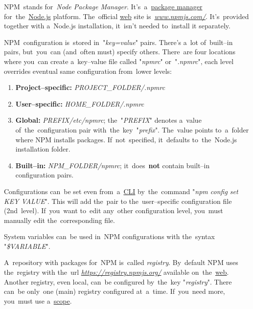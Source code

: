 


\label{nodejs}

\label{npm}
NPM~stands for~\textit{Node Package Manager}. It's~a~\hyperref[packagemanager]{package manager} for~the~\hyperref[nodejs]{Node.js} platform. The~official \hyperref[internetweb]{web} site is~\href{https://www.npmjs.com/}{\textit{www.npmjs.com/}}. It's~provided together with a~Node.js installation, it~isn't needed to~install it separately.

NPM~configuration is~stored in~"\textit{key=value}" pairs. There's a~lot of~built--in pairs, but~you~can (and~often must) specify others. There~are four locations where you~can create a~key--value file called "\textit{npmrc}" or~"\textit{.npmrc}", each level overrides eventual same configuration from~lower levels:
\begin{enumerate}
    \item \textbf{Project--specific:} \textit{PROJECT\_FOLDER/.npmrc}
    \item \textbf{User--specific:} \textit{HOME\_FOLDER/.npmrc}
    \item \textbf{Global:} \textit{PREFIX/etc/npmrc}; the~"\textit{PREFIX}" denotes a~value of~the~configuration pair with~the~key~"\textit{prefix}". The~value points to~a~folder where NPM installs packages. If~not~specified, it~defaults to~the~\mbox{Node.js} installation folder.
    \item \textbf{Built--in:} \textit{NPM\_FOLDER/npmrc}; it~does~\textbf{not} contain built--in configuration pairs.
\end{enumerate}

\noindent Configurations can~be set even from~a~\hyperref[shellcligui]{CLI} by~the~command "\textit{npm config set KEY VALUE}". This will add the~pair to the~user--specific configuration file (2nd~level). If~you~want to~edit any~other configuration level, you~must manually edit the~corresponding file.

\note System variables can~be used in~NPM configurations with the~syntax \mbox{"\textit{\${VARIABLE}}"}.

A~repository with packages for~NPM is~called \textit{registry}. By~default NPM uses the~registry with the~url \href{https://registry.npmjs.org/}{\textit{https://registry.npmjs.org/}} available on~the~\hyperref[internetweb]{web}. Another registry, even local, can~be configured by~the~key \mbox{"\textit{registry}"}. There can~be only~one (main) registry configured at~a~time. If~you~need more, you~must use a~\hyperref[npmscope]{scope}.

\label{npmscope}
